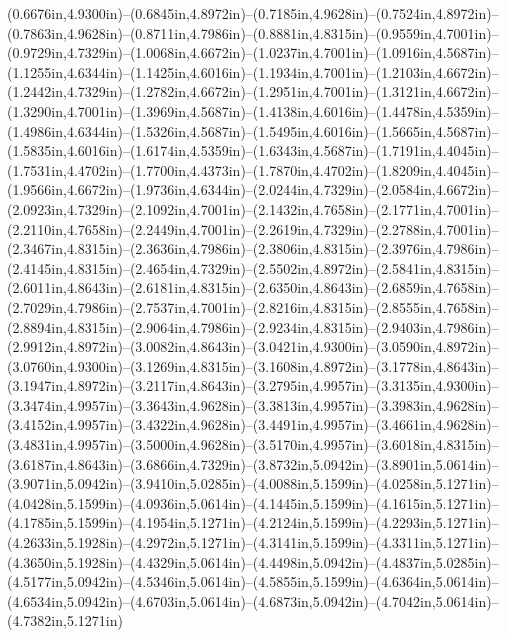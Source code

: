 (0.6676in,4.9300in)--(0.6845in,4.8972in)--(0.7185in,4.9628in)--(0.7524in,4.8972in)--(0.7863in,4.9628in)--(0.8711in,4.7986in)--(0.8881in,4.8315in)--(0.9559in,4.7001in)--(0.9729in,4.7329in)--(1.0068in,4.6672in)--(1.0237in,4.7001in)--(1.0916in,4.5687in)--(1.1255in,4.6344in)--(1.1425in,4.6016in)--(1.1934in,4.7001in)--(1.2103in,4.6672in)--(1.2442in,4.7329in)--(1.2782in,4.6672in)--(1.2951in,4.7001in)--(1.3121in,4.6672in)--(1.3290in,4.7001in)--(1.3969in,4.5687in)--(1.4138in,4.6016in)--(1.4478in,4.5359in)--(1.4986in,4.6344in)--(1.5326in,4.5687in)--(1.5495in,4.6016in)--(1.5665in,4.5687in)--(1.5835in,4.6016in)--(1.6174in,4.5359in)--(1.6343in,4.5687in)--(1.7191in,4.4045in)--(1.7531in,4.4702in)--(1.7700in,4.4373in)--(1.7870in,4.4702in)--(1.8209in,4.4045in)--(1.9566in,4.6672in)--(1.9736in,4.6344in)--(2.0244in,4.7329in)--(2.0584in,4.6672in)--(2.0923in,4.7329in)--(2.1092in,4.7001in)--(2.1432in,4.7658in)--(2.1771in,4.7001in)--(2.2110in,4.7658in)--(2.2449in,4.7001in)--(2.2619in,4.7329in)--(2.2788in,4.7001in)--(2.3467in,4.8315in)--(2.3636in,4.7986in)--(2.3806in,4.8315in)--(2.3976in,4.7986in)--(2.4145in,4.8315in)--(2.4654in,4.7329in)--(2.5502in,4.8972in)--(2.5841in,4.8315in)--(2.6011in,4.8643in)--(2.6181in,4.8315in)--(2.6350in,4.8643in)--(2.6859in,4.7658in)--(2.7029in,4.7986in)--(2.7537in,4.7001in)--(2.8216in,4.8315in)--(2.8555in,4.7658in)--(2.8894in,4.8315in)--(2.9064in,4.7986in)--(2.9234in,4.8315in)--(2.9403in,4.7986in)--(2.9912in,4.8972in)--(3.0082in,4.8643in)--(3.0421in,4.9300in)--(3.0590in,4.8972in)--(3.0760in,4.9300in)--(3.1269in,4.8315in)--(3.1608in,4.8972in)--(3.1778in,4.8643in)--(3.1947in,4.8972in)--(3.2117in,4.8643in)--(3.2795in,4.9957in)--(3.3135in,4.9300in)--(3.3474in,4.9957in)--(3.3643in,4.9628in)--(3.3813in,4.9957in)--(3.3983in,4.9628in)--(3.4152in,4.9957in)--(3.4322in,4.9628in)--(3.4491in,4.9957in)--(3.4661in,4.9628in)--(3.4831in,4.9957in)--(3.5000in,4.9628in)--(3.5170in,4.9957in)--(3.6018in,4.8315in)--(3.6187in,4.8643in)--(3.6866in,4.7329in)--(3.8732in,5.0942in)--(3.8901in,5.0614in)--(3.9071in,5.0942in)--(3.9410in,5.0285in)--(4.0088in,5.1599in)--(4.0258in,5.1271in)--(4.0428in,5.1599in)--(4.0936in,5.0614in)--(4.1445in,5.1599in)--(4.1615in,5.1271in)--(4.1785in,5.1599in)--(4.1954in,5.1271in)--(4.2124in,5.1599in)--(4.2293in,5.1271in)--(4.2633in,5.1928in)--(4.2972in,5.1271in)--(4.3141in,5.1599in)--(4.3311in,5.1271in)--(4.3650in,5.1928in)--(4.4329in,5.0614in)--(4.4498in,5.0942in)--(4.4837in,5.0285in)--(4.5177in,5.0942in)--(4.5346in,5.0614in)--(4.5855in,5.1599in)--(4.6364in,5.0614in)--(4.6534in,5.0942in)--(4.6703in,5.0614in)--(4.6873in,5.0942in)--(4.7042in,5.0614in)--(4.7382in,5.1271in)
